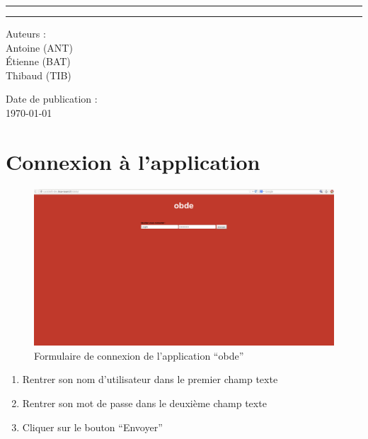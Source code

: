\documentclass[a4paper, 12pt, french]{article}
\begin{document}
	\begin{center}
	    \rule{\linewidth}{1pt}
		\LARGE{}
	    \rule{\linewidth}{1pt} \newline{} \newline{}
	\end{center}
	\begin{center}
	    \large{Auteurs :}\\ Antoine  (ANT)\\ Étienne  (BAT) \\ Thibaud  (TIB)
	\end{center}
	\vspace{20px}
	\begin{center}
		\large{Date de publication :}\\ \today
	\end{center}

	\section{Connexion à l'application}
	\begin{figure}[H]
    \begin{center}
        \includegraphics[width=16cm]{screenshoot.png}
    \end{center}
    \caption{Formulaire de connexion de l'application \enquote{obde}}
    \label{img_2}
\end{figure}
	\begin{enumerate}
		\item Rentrer son nom d'utilisateur dans le premier champ texte 
		\item Rentrer son mot de passe dans le deuxième champ texte 
		\item Cliquer sur le bouton \enquote{Envoyer}
	\end{enumerate}
\end{document}
